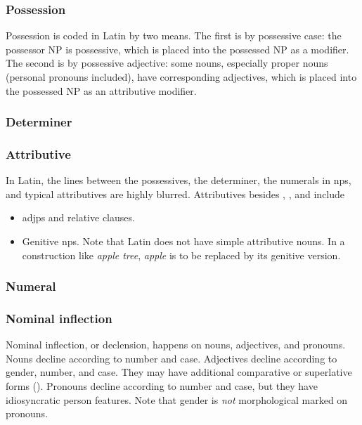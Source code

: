 \documentclass{article}
\newcommand*{\corpus}[1]{\emph{#1}}
\begin{document}
\subsubsection{Possession}\label{sec:possessive-abs}

Possession is coded in Latin by two means.
The first is by possessive case: 
the possessor NP is possessive, which is placed into the possessed NP as a modifier.
The second is by possessive adjective:
some nouns, especially proper nouns (personal pronouns included), have corresponding adjectives,
which is placed into the possessed NP as an attributive modifier.

\subsubsection{Determiner}\label{sec:determiner-abs}


\subsubsection{Attributive}

In Latin, the lines between the possessives, 
the determiner, the numerals in \ac{np}s, 
and typical attributives 
are highly blurred.
Attributives besides 
, 
, 
and  include 
\begin{itemize}
    \item \ac{adjp}s and relative clauses. %
    \item Genitive \ac{np}s. Note that Latin does not have simple attributive nouns.
    In a construction like \corpus{apple tree}, \corpus{apple} is to be replaced by its genitive version.
\end{itemize}

\subsubsection{Numeral}\label{sec:numeral-np-abs}



\subsubsection{Nominal inflection}\label{sec:nominal-inflection-abs}

Nominal inflection, or declension, happens on nouns, adjectives, and pronouns.
Nouns decline according to number and case.
Adjectives decline according to gender, number, and case.
They may have additional comparative or superlative forms ().
Pronouns decline according to number and case,
but they have idiosyncratic person features.
Note that gender is \emph{not} morphological marked on pronouns.
\end{document}
